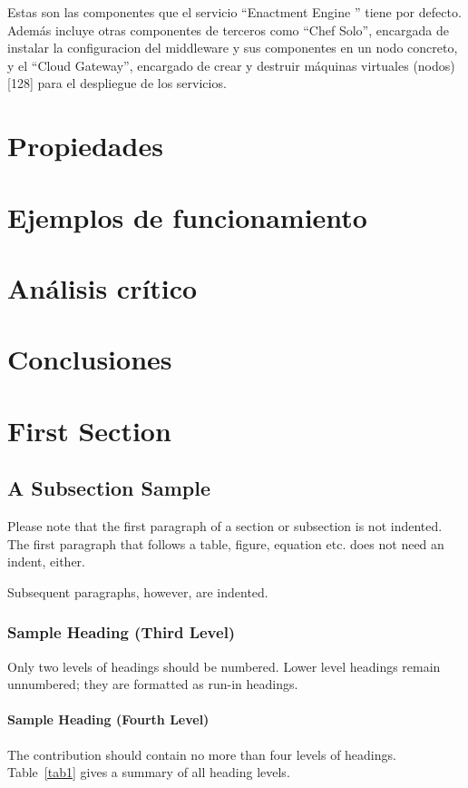 \documentclass[runningheads]{llncs}
\begin{document}
Estas son las componentes que el servicio ``Enactment Engine '' tiene por defecto. Además incluye otras componentes de terceros como ``Chef Solo'', encargada de instalar la configuracion del middleware y sus componentes en un nodo concreto, y el ``Cloud Gateway'', encargado de crear y destruir máquinas virtuales (nodos)[128] para el despliegue de los servicios.

\section{Propiedades}
\section{Ejemplos de funcionamiento}
\section{Análisis crítico}
\section{Conclusiones}
\section{First Section}
\subsection{A Subsection Sample}
Please note that the first paragraph of a section or subsection is
not indented. The first paragraph that follows a table, figure,
equation etc. does not need an indent, either.

Subsequent paragraphs, however, are indented.

\subsubsection{Sample Heading (Third Level)} Only two levels of
headings should be numbered. Lower level headings remain unnumbered;
they are formatted as run-in headings.

\paragraph{Sample Heading (Fourth Level)}
The contribution should contain no more than four levels of
headings. Table~\ref{tab1} gives a summary of all heading levels.
\end{document}
